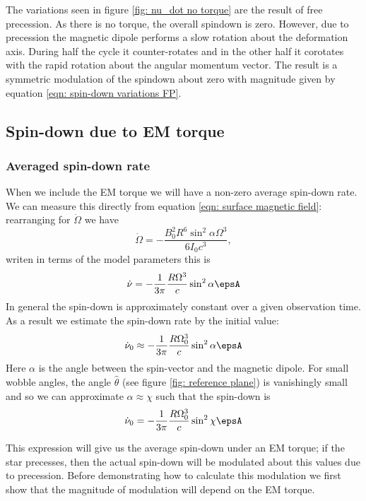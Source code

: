 \documentclass[/home/greg/Thesis/main/main.tex]{subfiles}
\begin{document}
The variations seen in figure \ref{fig: nu_dot no torque} are the result of
free precession. As there is no torque, the overall spindown is zero. However,
due to precession the magnetic dipole performs a slow rotation about the
deformation axis. During half the cycle it counter-rotates and in the other
half it corotates with the rapid rotation about the angular momentum vector.
The result is a symmetric modulation of the spindown about zero with magnitude
given by equation \eqref{eqn: spin-down variations FP}.

\subsection{Spin-down due to EM torque}
\subsubsection{Averaged spin-down rate}
When we include the EM torque we will have a non-zero average spin-down rate. 
We can measure this directly from equation \eqref{eqn: surface magnetic field}:
rearranging for $\dot{\Omega}$ we have
\begin{equation}
    \dot{\Omega} = -\frac{B_{0}^{2}R^{6} \sin^{2}\alpha \Omega^{3}}{6I_{0}c^{3}},
\end{equation}
writen in terms of the model parameters this is
\begin{equation}
\dot{\nu} = -\frac{1}{3\pi}\frac{R \Omega^{3}}{c} \sin^{2}\alpha \epsA
\end{equation}
In general the spin-down is approximately constant over a given observation
time. As a result we estimate the spin-down rate by the initial value:
\begin{equation}
    \dot{\nu}_{0} \approx -\frac{1}{3\pi}\frac{R \Omega_{0}^{3}}{c} \sin^{2}\alpha \epsA
    \label{eqn: spin-down initial EM}
\end{equation}
Here $\alpha$ is the angle between the spin-vector and the magnetic dipole. For
small wobble angles, the angle $\hat{\theta}$ (see figure \ref{fig: reference plane})
is vanishingly small and so we can approximate $\alpha \approx \chi$ such that
the spin-down is 
\begin{equation}
    \dot{\nu}_{0} = -\frac{1}{3\pi}\frac{R \Omega_{0}^{3}}{c} \sin^{2}\chi \epsA
    \label{eqn: spin-down initial EM chi}
\end{equation}

This expression will give us the average spin-down under an EM torque; if the
star precesses, then the actual spin-down will be modulated about this values
due to precession. Before demonstrating how to calculate this modulation we
first show that the magnitude of modulation will depend on the EM torque.
\end{document}

